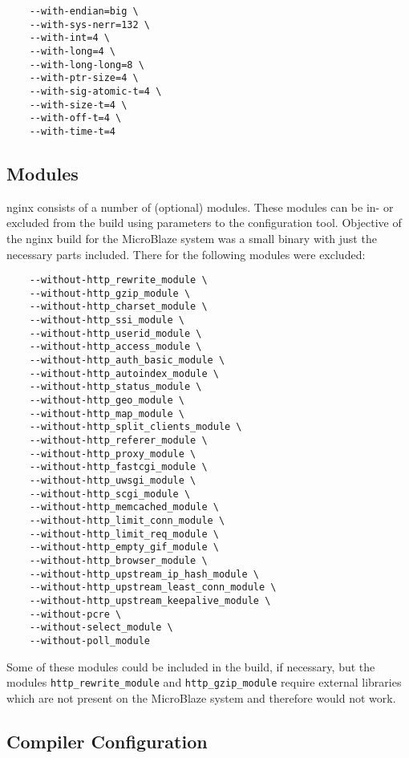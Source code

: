 \begin{verbatim}
    --with-endian=big \
    --with-sys-nerr=132 \
    --with-int=4 \
    --with-long=4 \
    --with-long-long=8 \
    --with-ptr-size=4 \
    --with-sig-atomic-t=4 \
    --with-size-t=4 \
    --with-off-t=4 \
    --with-time-t=4
\end{verbatim}

\subsection{Modules}

nginx consists of a number of (optional) modules. These modules can be in- or excluded from the build using parameters to the configuration tool. Objective of the nginx build for the MicroBlaze system was a small binary with just the necessary parts included. There for the following modules were excluded:

\begin{verbatim}
    --without-http_rewrite_module \
    --without-http_gzip_module \
    --without-http_charset_module \
    --without-http_ssi_module \
    --without-http_userid_module \
    --without-http_access_module \
    --without-http_auth_basic_module \
    --without-http_autoindex_module \
    --without-http_status_module \
    --without-http_geo_module \
    --without-http_map_module \
    --without-http_split_clients_module \
    --without-http_referer_module \
    --without-http_proxy_module \
    --without-http_fastcgi_module \
    --without-http_uwsgi_module \
    --without-http_scgi_module \
    --without-http_memcached_module \
    --without-http_limit_conn_module \
    --without-http_limit_req_module \
    --without-http_empty_gif_module \
    --without-http_browser_module \
    --without-http_upstream_ip_hash_module \
    --without-http_upstream_least_conn_module \
    --without-http_upstream_keepalive_module \
    --without-pcre \
    --without-select_module \
    --without-poll_module
\end{verbatim}

Some of these modules could be included in the build, if necessary, but the modules \texttt{http\_rewrite\_module} and \texttt{http\_gzip\_module} require external libraries which are not present on the MicroBlaze system and therefore would not work.

\subsection{Compiler Configuration}

